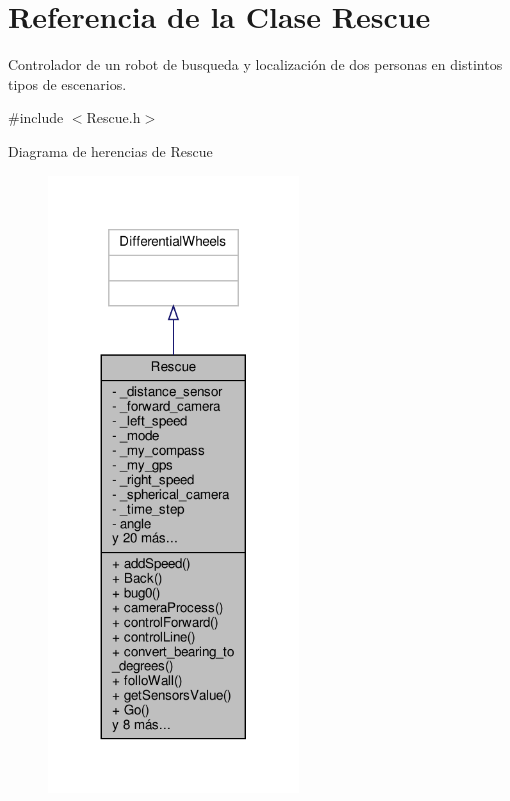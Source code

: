 \hypertarget{classRescue}{}\section{Referencia de la Clase Rescue}
\label{classRescue}


Controlador de un robot de busqueda y localización de dos personas en distintos tipos de escenarios.  




{\ttfamily \#include $<$Rescue.\+h$>$}



Diagrama de herencias de Rescue\nopagebreak
\begin{figure}[H]
\begin{center}
\leavevmode
\includegraphics[width=188pt]{classRescue__inherit__graph}
\end{center}
\end{figure}


